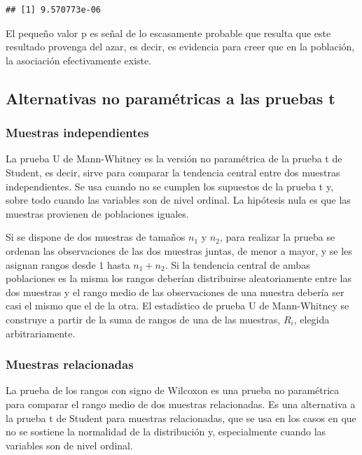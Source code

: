 \documentclass[]{book}
\begin{document}
\begin{verbatim}
## [1] 9.570773e-06
\end{verbatim}

El pequeño valor p es señal de lo escasamente probable que resulta que
este resultado provenga del azar, es decir, es evidencia para creer que
en la población, la asociación efectivamente existe.

\hypertarget{alternativas-no-paramuxe9tricas-a-las-pruebas-t}{%
\subsection{Alternativas no paramétricas a las pruebas t}\label{alternativas-no-paramuxe9tricas-a-las-pruebas-t}}

\hypertarget{muestras-independientes-1}{%
\subsubsection{Muestras independientes}\label{muestras-independientes-1}}

La prueba U de Mann-Whitney es la versión no paramétrica de la prueba t
de Student, es decir, sirve para comparar la tendencia central entre dos
muestras independientes. Se usa cuando no se cumplen los supuestos de la
prueba t y, sobre todo cuando las variables son de nivel ordinal. La
hipótesis nula es que las muestras provienen de poblaciones iguales.

Si se dispone de dos muestras de tamaños \(n_{1}\) y \(n_{2}\), para
realizar la prueba se ordenan las observaciones de las dos muestras
juntas, de menor a mayor, y se les asignan rangos desde \(1\) hasta
\(n_{1} + n_{2}\). Si la tendencia central de ambas poblaciones es la
misma los rangos deberían distribuirse aleatoriamente entre las dos
muestras y el rango medio de las observaciones de una muestra debería
ser casi el mismo que el de la otra. El estadístico de prueba U de
Mann-Whitney se construye a partir de la suma de rangos de una de las
muestras, \(R_{i}\), elegida arbitrariamente.

\hypertarget{muestras-relacionadas}{%
\subsubsection{Muestras relacionadas}\label{muestras-relacionadas}}

La prueba de los rangos con signo de Wilcoxon es una prueba no
paramétrica para comparar el rango medio de dos muestras relacionadas.
Es una alternativa a la prueba t de Student para muestras relacionadas,
que se usa en los casos en que no se sostiene la normalidad de la
distribución y, especialmente cuando las variables son de nivel ordinal.
\end{document}
